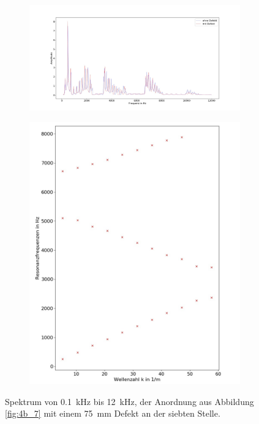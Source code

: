 \begin{figure}
\centering
\begin{subfigure}{0.65\textwidth}
\includegraphics[width=\textwidth]{content/Scripts/defect3.jpg}
\end{subfigure}
\begin{subfigure}{0.34\textwidth}
\includegraphics[width=\textwidth]{content/Scripts/4b_7_1c.jpg}
\end{subfigure}
\caption{Spektrum von 0.1~kHz bis 12~kHz, der Anordnung aus Abbildung \ref{fig:4b_7} mit einem 75~mm Defekt an der siebten Stelle.}
\label{fig:4b_7_1c}
\end{figure}
